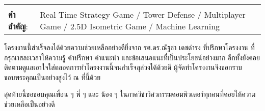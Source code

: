 \documentclass[12pt,oneside,openright,a4paper]{cpe-thai-project}
\begin{document}
\begin{flushleft}
\begin{tabular*}{\textwidth}{@{}lp{}}
 & \\

\textbf{คำสำคัญ}: & Real Time Strategy Game / Tower Defense / Multiplayer Game / 2.5D Isometric Game / Machine Learning
\end{tabular*}
\end{flushleft}
\endabstract



\preface
โครงงานนี้สำเร็จลงได้ด้วยความช่วยเหลืออย่างดียิ่งจาก รศ.ดร.ณัฐชา เดชดำรง ที่ปรึกษาโครงงาน 
ที่กรุณาสละเวลาให้ความรู้ คำปรึกษา คำแนะนำ และข้อเสนอแนะที่เป็นประโยชน์อย่างมาก 
อีกทั้งยังคอยติดตามดูแลเอาใจใส่ตลอดการทำโครงงานนี้จนสำเร็จลุล่วงได้ด้วยดี 
ผู้จัดทำโครงงานจึงขอกราบขอบพระคุณเป็นอย่างสูงไว้ ณ ที่นี้ด้วย

สุดท้ายนี้ขอขอบคุณเพื่อน ๆ พี่ ๆ และ น้อง ๆ ในภาควิชาวิศวกรรมคอมพิวเตอร์ทุกคนที่คอยให้ความช่วยเหลือเป็นอย่างดี


\tableofcontents                    
\listoftables
\listoffigures                      

\end{document}
